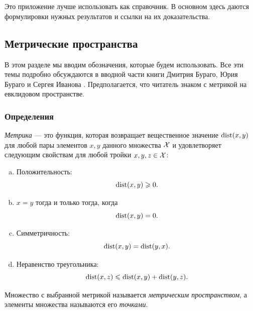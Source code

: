 \chapter[Приложение]{}
\chaptermark{}

\vskip5mm

{\footnotesize

Это приложение лучше использовать как справочник.
В основном здесь даются формулировки нужных результатов и ссылки на их доказательства.

\section{Метрические пространства}\label{sec:metric-spcaes}


В этом разделе мы вводим обозначения, которые будем использовать.
Все эти темы подробно обсуждаются в вводной части книги Дмитрия Бураго, Юрия Бураго и Сергея Иванова \cite{burago-burago-ivanov}.
Предполагается, что читатель знаком с метрикой на евклидовом пространстве.


\subsection*{Определения}

\emph{Метрика} --- это функция, которая возвращает вещественное значение $\mathop{\rm dist}\nolimits(x,y)$ для любой пары элементов $x,y$ данного множества $\mathcal{X}$ и удовлетворяет следующим свойствам для любой тройки $x,y,z\in\mathcal{X}$: \label{page:def:metric}
\begin{enumerate}[(a)]
\item\label{def:metric-space:a}
Положительность: 
$$\mathop{\rm dist}\nolimits(x,y)\geqslant 0.$$
\item\label{def:metric-space:b}
$x=y$ тогда и только тогда, когда 
$$\mathop{\rm dist}\nolimits(x,y)=0.$$
\item\label{def:metric-space:c}
Симметричность: $$\mathop{\rm dist}\nolimits(x, y) = \mathop{\rm dist}\nolimits(y, x).$$
\item\label{def:metric-space:d}
Неравенство треугольника: 
$$\mathop{\rm dist}\nolimits(x, z) \leqslant \mathop{\rm dist}\nolimits(x, y) + \mathop{\rm dist}\nolimits(y, z).$$
\end{enumerate}

{\sloppy

Множество с выбранной метрикой называется \emph{метрическим пространством}, а элементы множества называются его \emph{точками}.

}}
